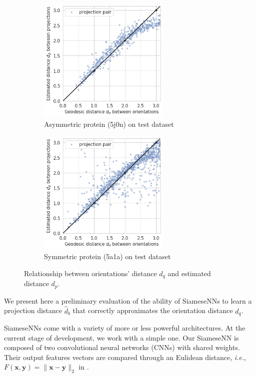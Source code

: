\begin{figure}
    \centering
    \begin{subfigure}[b]{0.45\textwidth}
        \includegraphics[height=6cm]{images/dPdQ_5j0n.png}
        \caption{Asymmetric protein (5j0n) on test dataset}
    \end{subfigure}
    \hfill
    \begin{subfigure}[b]{0.50\textwidth}
    \centering
        \includegraphics[height=6cm]{images/dPdQ_5a1a.png}
        \caption{Symmetric protein (5a1a) on test dataset}
    \end{subfigure}
    \caption{Relationship between orientations' distance $d_q$ and estimated distance $d_p$.}
    \label{fig:minim-loss-perfect-distances}
\end{figure}

We present here a preliminary evaluation of the ability of SiameseNNs to learn a projection distance $\widehat{d}_b$ that correctly approximates the orientation distance $d_q$.

SiameseNNs come with a variety of more or less powerful architectures.
At the current stage of development, we work with a simple one.
Our SiameseNN is composed of two convolutional neural networks (CNNs) with shared weights.
Their output features vectors are compared through an Eulidean distance, \textit{i.e.}, $F(\mathbf{x},\mathbf{y})=\lVert \mathbf{x}-\mathbf{y}\rVert_2$ in .

